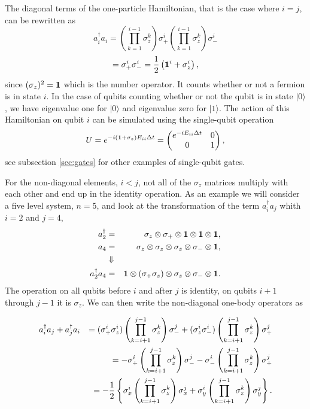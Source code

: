 The diagonal terms of the one-particle Hamiltonian, 
that is the case where $i=j$, can be rewritten as
\[
a^\dag_i a_i = \left(\prod_{k=1}^{i-1} \sigma_z^k\right) \sigma_+^i
\left(\prod_{k=1}^{i-1} \sigma_z^k \right)\sigma_-^i
\]
\begin{equation}
\label{eq:H_1Sigmas}
= \sigma_+^i \sigma_-^i = \frac{1}{2}\left({\bf 1}^i + \sigma_z^i\right),
\end{equation}
since $(\sigma_z)^2= {\bf 1}$ which is the number operator. It counts whether or not a fermion is in
state $i$. In the case of qubits counting whether or not the qubit
is in state $ |0\rangle $, we have eigenvalue one for $ |0\rangle $ and eigenvalue
zero for $ |1\rangle $. The action of this Hamiltonian on qubit $i$ can be simulated using
the single-qubit operation 
\begin{equation}
U=e^{-i({\bf 1} + \sigma_z) E_{ii}\Delta t} = \begin{pmatrix}
  e^{-iE_{ii}\Delta t} & 0 \\
  0 & 1 
\end{pmatrix},
\end{equation}
see subsection \ref{sec:gates} for other examples of single-qubit gates.

For the non-diagonal elements, $i<j$,  not all of the $\sigma_z$ matrices multiply with each
other and end up in the identity operation. 
As an example we will consider a five level system, $n=5$, and look
at the transformation of the term $a^\dag_ia_j$ whith $i=2$ and $j=4$,
\begin{eqnarray}
\label{eq:fiveQubitSystem}
a_2^\dag& = &\sigma_z\otimes\sigma_+\otimes {\bf 1} \otimes {\bf 1}\otimes {\bf 1}, \notag\\
a_4 & = & \sigma_z\otimes\sigma_z\otimes\sigma_z\otimes\sigma_-\otimes {\bf 1}, \notag\\ 
 & \Downarrow & \notag\\
a_2^\dag a_4 & = & {\bf 1}\otimes (\sigma_+\sigma_z)\otimes \sigma_z \otimes \sigma_-\otimes {\bf 1}.
\end{eqnarray}
The operation on all qubits
before $i$ and after $j$ is identity, on qubits $i+1$ through
$j-1$ it is  $\sigma_z$.  
We can then write the non-diagonal one-body operators as

\begin{eqnarray}
\label{eq:singleParticle}
a^\dag_i a_j + a^\dag_j a_i &&= (\sigma_+^i\sigma_z^i)
\left(\prod_{k=i+1}^{j-1} 
\sigma_z^k \right)\sigma_-^j
+
(\sigma_z^i\sigma_-^i) \left(\prod_{k=i+1}^{j-1}
\sigma_z^k \right)\sigma_+^j \notag\\
&&= - \sigma_+^i \left(\prod_{k=i+1}^{j-1}\sigma_z^k \right)\sigma_-^j
- \sigma_-^i \left(\prod_{k=i+1}^{j-1}
\sigma_z^k \right)\sigma_+^j \notag\\
&&= -\frac{1}{2} \left\{ 
\sigma_x^i \left(\prod_{k=i+1}^{j-1}\sigma_z^k \right)\sigma_x^j
+ \sigma_y^i \left(\prod_{k=i+1}^{j-1}\sigma_z^k \right)\sigma_y^j
\right\}.
\end{eqnarray}



